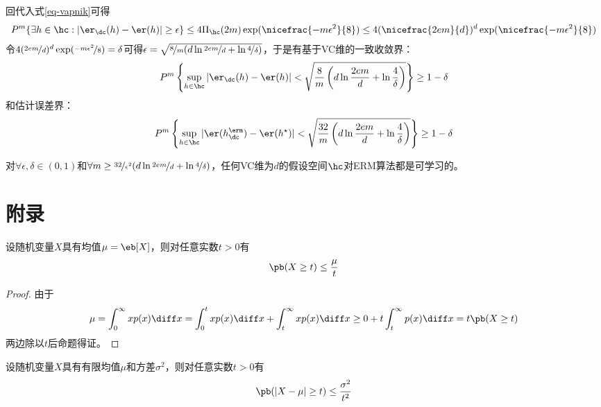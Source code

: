 \documentclass{ctexart}
\begin{document}
回代入式\eqref{eq-vapnik}可得
\begin{align*}
    P^m \{ \exists h \in \hc: |\er_\dc (h) - \er (h)| \ge \epsilon \} \le 4 \Pi_\hc (2m) \exp ( \nicefrac{-m \epsilon^2}{8} ) \le 4 (\nicefrac{2em}{d})^d \exp ( \nicefrac{-m \epsilon^2}{8} )
\end{align*}
令$4 (\nicefrac{2em}{d})^d \exp ( \nicefrac{-m \epsilon^2}{8} ) = \delta$可得$\epsilon = \sqrt{\nicefrac{8}{m} (d \ln \nicefrac{2em}{d} + \ln \nicefrac{4}{\delta})}$，于是有基于VC维的一致收敛界：
\begin{align*}
    P^m \left\{ \sup_{h \in \hc} |\er_\dc (h) - \er (h)| < \sqrt{\frac{8}{m} \left(d \ln \frac{2em}{d} + \ln \frac{4}{\delta} \right)} \right\} \ge 1 - \delta
\end{align*}
和估计误差界：
\begin{align*}
    P^m \left\{ \sup_{h \in \hc} |\er (h_\dc^\erm) - \er (h^\star)| < \sqrt{\frac{32}{m} \left(d \ln \frac{2em}{d} + \ln \frac{4}{\delta} \right)} \right\} \ge 1 - \delta
\end{align*}

\begin{theorem}
    对$\forall \epsilon, \delta \in (0,1)$和$\forall m \ge \nicefrac{32}{\epsilon^2} (d \ln \nicefrac{2em}{d} + \ln \nicefrac{4}{\delta} )$，任何VC维为$d$的假设空间$\hc$对ERM算法都是可学习的。
\end{theorem}

\section{附录}

\begin{theorem} 
    设随机变量$X$具有均值$\mu = \eb[X]$，则对任意实数$t>0$有
    \begin{align*}
        \pb (X \ge t) \le \frac{\mu}{t}
    \end{align*}
\end{theorem}

\begin{proof}
    由于
    \begin{align*}
        \mu = \int_0^\infty x p(x) \diff x = \int_0^t x p(x) \diff x + \int_t^\infty x p(x) \diff x \ge 0 + t \int_t^\infty p(x) \diff x = t \pb (X \ge t)
    \end{align*}
    两边除以$t$后命题得证。
\end{proof}

\begin{theorem} 
    设随机变量$X$具有有限均值$\mu$和方差$\sigma^2$，则对任意实数$t>0$有
    \begin{align*}
        \pb (|X - \mu| \ge t) \le \frac{\sigma^2}{t^2}
    \end{align*}
\end{theorem}
\end{document}
